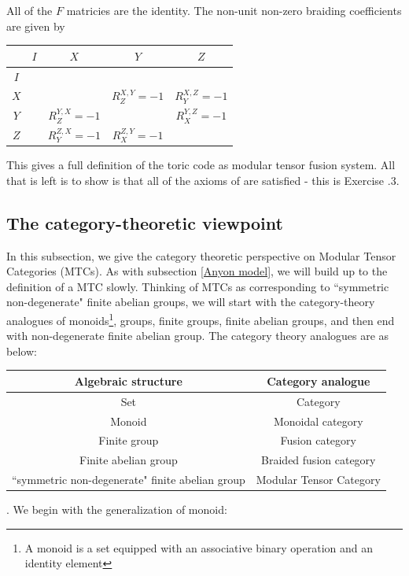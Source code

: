 \documentclass{article}
\theoremstyle{definition}
\numberwithin{figure}{section}
\begin{document}
All of the $F$ matricies are the identity. The non-unit non-zero braiding coefficients are given by

\begin{center}
\begin{tabular}{c |c |c |c |c} 
  & $I$ & $X$ & $Y$ & $Z$ \\ [0.5ex] 
 \hline
 $I$ & & &  &  \\ 
 \hline
 $X$ & &  & $R^{X,Y}_{Z}=-1$ & $R^{X,Z}_{Y}=-1$ \\
 \hline
 $Y$ &  & $R^{Y,X}_{Z}=-1$ & & $R^{Y,Z}_{X}=-1$ \\
 \hline
 $Z$ &  & $R^{Z,X}_{Y}=-1$ & $R^{Z,Y}_X=-1$ & 
\end{tabular}
\end{center}

This gives a full definition of the toric code as modular tensor fusion system. All that is left is to show is that all of the axioms of are satisfied - this is Exercise \thesection.3.


\subsection{The category-theoretic viewpoint}
\label{Category viewpoint}

In this subsection, we give the category theoretic perspective on Modular Tensor Categories (MTCs). As with subsection \ref{Anyon model}, we will build up to the definition of a MTC slowly. Thinking of MTCs as corresponding to ``symmetric non-degenerate" finite abelian groups, we will start with the category-theory analogues of monoids\footnote{A monoid is a set equipped with an associative binary operation and an identity element}, groups, finite groups, finite abelian groups, and then end with non-degenerate finite abelian group. The category theory analogues are as below:

\begin{center}
\begin{tabular}{c ||c } 
  
Algebraic structure & Category analogue \\
\hline
\hline
Set & Category \\ 
 \hline
Monoid & Monoidal category\\
 \hline
Finite group &  Fusion category\\
 \hline
Finite abelian group & Braided fusion category \\
\hline
``symmetric non-degenerate" finite abelian group & Modular Tensor Category  
\end{tabular}
\end{center}
. We begin with the generalization of monoid:
\end{document}
